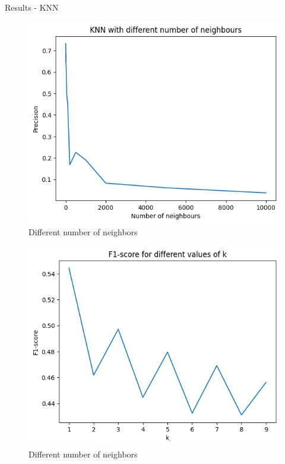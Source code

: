 \documentclass{beamer}
\begin{document}
\begin{frame}[t]{Results - KNN}
 {
	\vspace{-3mm}
	\begin{figure}[h]
		\caption{Different number of neighbors}
		\centering
		\includegraphics[width=0.73\linewidth]{images/KNN/f1_score_over_k_large.png}
	\end{figure}
}

\pause
{} {
	\vspace{-3mm}
	\begin{figure}[h]
		\caption{Different number of neighbors}
		\centering
		\includegraphics[width=0.73\linewidth]{images/KNN/f1_score_over_k.png}
	\end{figure}
}


\end{frame}
\end{document}
